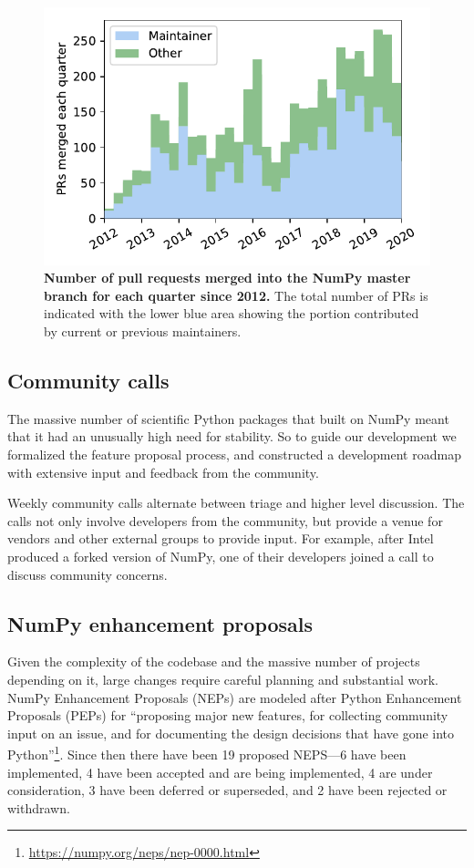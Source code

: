 \documentclass[twocolumn]{article}
\begin{document}
\begin{figure}
    \centering
    \includegraphics[width=0.9\linewidth]{PRs-using-CURRENT_MAINTAINERS.pdf}
    \caption{\textbf{Number of pull requests merged into the NumPy master branch for each
        quarter since 2012.} The total number of PRs is indicated with the
        lower blue area showing the portion contributed by current or previous
        maintainers.}\label{fig:prs-over-time}
\end{figure}



\subsection*{Community calls}

The massive number of scientific Python packages that
built on NumPy meant that it had an unusually high need for stability.
So to guide our development we formalized the feature proposal process, and
constructed a development roadmap with extensive input and feedback from the
community.


Weekly community calls alternate between triage and
higher level discussion.  The calls not only involve developers from
the community, but provide a venue for vendors and other external
groups to provide input.  For example, after Intel produced a forked
version of NumPy, one of their developers joined a call to discuss
community concerns.

\subsection*{NumPy enhancement proposals}

Given the complexity of the codebase and the massive number of projects depending
on it, large changes require careful planning and substantial work.
NumPy Enhancement Proposals (NEPs) are modeled after
Python Enhancement Proposals (PEPs) for ``proposing major new
features, for collecting community input on an issue, and for
documenting the design decisions that have gone into
Python''\footnote{\url{https://numpy.org/neps/nep-0000.html}}.
Since then there have been 19 proposed NEPS---6 have been implemented,
4 have been accepted and are being implemented, 4 are under
consideration, 3 have been deferred or superseded, and 2 have been rejected
or withdrawn.
\end{document}
